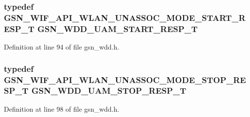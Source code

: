 \hypertarget{a00603_a42d71a0411d0f941e080667bdb171e95}{
\subsubsection[{GSN\_\-WDD\_\-UAM\_\-START\_\-RESP\_\-T}]{\setlength{\rightskip}{0pt plus 5cm}typedef {\bf GSN\_\-WIF\_\-API\_\-WLAN\_\-UNASSOC\_\-MODE\_\-START\_\-RESP\_\-T} {\bf GSN\_\-WDD\_\-UAM\_\-START\_\-RESP\_\-T}}}
\label{a00603_a42d71a0411d0f941e080667bdb171e95}


Definition at line 94 of file gsn\_\-wdd.h.

\hypertarget{a00603_a80285c8663f782eba22ba3a5f4d39b38}{
\subsubsection[{GSN\_\-WDD\_\-UAM\_\-STOP\_\-RESP\_\-T}]{\setlength{\rightskip}{0pt plus 5cm}typedef {\bf GSN\_\-WIF\_\-API\_\-WLAN\_\-UNASSOC\_\-MODE\_\-STOP\_\-RESP\_\-T} {\bf GSN\_\-WDD\_\-UAM\_\-STOP\_\-RESP\_\-T}}}
\label{a00603_a80285c8663f782eba22ba3a5f4d39b38}


Definition at line 98 of file gsn\_\-wdd.h.

